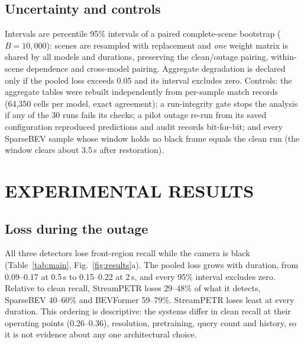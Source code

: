 \documentclass[letterpaper, 10 pt, conference]{ieeeconf}
\begin{document}
\subsection{Uncertainty and controls}
Intervals are percentile 95\% intervals of a paired complete-scene bootstrap ($B=10{,}000$): scenes are resampled with replacement and \emph{one} weight matrix is shared by all models and durations, preserving the
clean/outage pairing, within-scene dependence and cross-model pairing. Aggregate degradation is declared only if the pooled loss exceeds 0.05 and its interval excludes zero.
Controls: the aggregate tables were rebuilt independently from per-sample match records (64,350 cells per model, exact agreement); a run-integrity gate stops the analysis if any of the 30 runs fails its checks;
a pilot outage re-run from its saved configuration reproduced predictions and audit records bit-for-bit; and every SparseBEV sample whose window holds no black frame equals the clean run (the window clears about 3.5\,s after restoration).

\section{EXPERIMENTAL RESULTS}

\subsection{Loss during the outage}
All three detectors lose front-region recall while the camera is black (Table~\ref{tab:main}, Fig.~\ref{fig:results}a). The pooled loss grows with duration, from
0.09--0.17 at 0.5\,s to 0.15--0.22 at 2\,s, and every 95\% interval excludes zero. Relative to clean recall, StreamPETR loses 29--48\% of what it detects, SparseBEV 40--60\% and
BEVFormer 59--79\%. StreamPETR loses least at every duration. This ordering is descriptive: the systems differ in clean recall at their operating points (0.26--0.36), resolution, pretraining, query count and history, so it is not
evidence about any one architectural choice.
\end{document}
